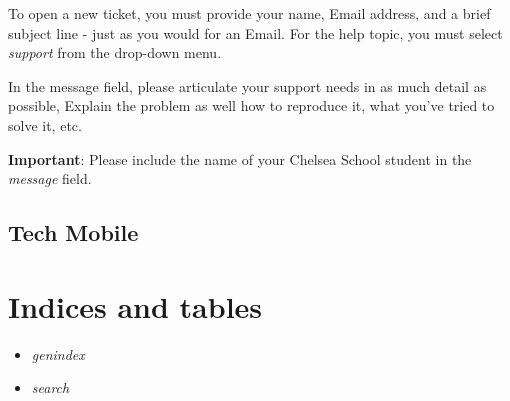 \documentclass[letterpaper,10pt,english]{sphinxmanual}
\begin{document}
To open a new ticket, you must provide your name, Email address, and a brief subject line - just as you would for an Email. For the help topic, you must select \emph{support} from the drop-down menu.

In the message field, please articulate your support needs in as much detail as possible, Explain the problem as well how to reproduce it, what you've tried to solve it, etc.

\textbf{Important}: Please include the name of your Chelsea School student in the \emph{message} field.


\section{Tech Mobile}
\label{helpdesk:tech-mobile}\label{helpdesk:osticket}

\chapter{Indices and tables}
\label{Index:indices-and-tables}\label{Index:index-0}\begin{itemize}
\item {} 
\emph{genindex}

\item {} 
\emph{search}

\end{itemize}



\renewcommand{\indexname}{Index}
\printindex
\end{document}
